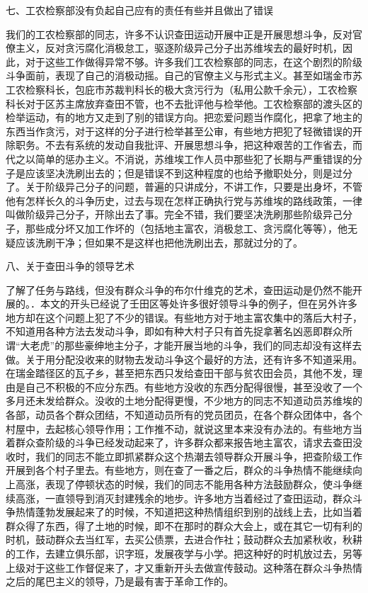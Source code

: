 七、工农检察部没有负起自己应有的责任有些并且做出了错误

我们的工农检察部的同志，许多不认识查田运动开展中正是开展思想斗争，反对官僚主义，反对贪污腐化消极怠工，驱逐阶级异己分子出苏维埃去的最好时机，因此，对于这些工作做得异常不够。许多我们工农检察部的同志，在这个剧烈的阶级斗争面前，表现了自己的消极动摇。自己的官僚主义与形式主义。甚至如瑞金市苏工农检察科长，包庇市苏裁判科长的极大贪污行为（私用公款千余元），工农检察科长对于区苏主席放弃查田不管，也不去批评他与检举他。工农检察部的渡头区的检举运动，有的地方又走到了别的错误方向。把恋爱问题当作腐化，把拿了地主的东西当作贪污，对于这样的分子进行检举甚至公审，有些地方把犯了轻微错误的开除职务。不去有系统的发动自我批评、开展思想斗争，把这种艰苦的工作省去，而代之以简单的惩办主义。不消说，苏维埃工作人员中那些犯了长期与严重错误的分子是应该坚决洗刷出去的；但是错误不到这种程度的也给予撤职处分，则是过分了。关于阶级异己分子的问题，普遍的只讲成分，不讲工作，只要是出身坏，不管他有怎样长久的斗争历史，过去与现在怎样正确执行党与苏维埃的路线政策，一律叫做阶级异己分子，开除出去了事。完全不错，我们要坚决洗刷那些阶级异己分子，那些成分坏又加工作坏的（包括地主富农，消极怠工、贪污腐化等等），他无疑应该洗刷干净；但如果不是这样也把他洗刷出去，那就过分的了。

八、关于查田斗争的领导艺术

了解了任务与路线，但没有群众斗争的布尔什维克的艺术，查田运动是仍然不能开展的。．本文的开头已经说了壬田区等处许多很好领导斗争的例子，但在另外许多地方却在这个问题上犯了不少的错误。有些地方对于地主富农集中的落后大村子，不知道用各种方法去发动斗争，即如有种大村子只有首先捉拿著名凶恶即群众所谓“大老虎”的那些豪绅地主分子，才能开展当地的斗争，我们的同志却没有这样去做。关于用分配没收来的财物去发动斗争这个最好的方法，还有许多不知道采用。在瑞金踏径区的瓦子乡，甚至把东西只发给查田干部与贫农田会员，其他不发，理由是自己不积极的不应分东西。有些地方没收的东西分配得很慢，甚至没收了一个多月还未发给群众。没收的土地分配得更慢，不少地方的同志不知道动员苏维埃的各部，动员各个群众团结，不知道动员所有的党员团员，在各个群众团体中，各个村屋中，去起核心领导作用；工作推不动，就说这里本来没有办法的。有些地方当着群众查阶级的斗争已经发动起来了，许多群众都来报告地主富农，请求去查田没收时，我们的同志不能立即抓紧群众这个热潮去领导群众开展斗争，把查阶级工作开展到各个村子里去。有些地方，则在查了一番之后，群众的斗争热情不能继续向上高涨，表现了停顿状态的时候，我们的同志不能用各种方法鼓励群众，使斗争继续高涨，一直领导到消灭封建残余的地步。许多地方当着经过了查田运动，群众斗争热情蓬勃发展起来了的时候，不知道把这种热情组织到别的战线上去，比如当着群众得了东西，得了土地的时候，即不在那时的群众大会上，或在其它一切有利的时机，鼓动群众去当红军，去买公债票，去进合作社；鼓动群众去加紧秋收，秋耕的工作，去建立俱乐部，识字班，发展夜学与小学。把这种好的时机放过去，另等上级对于这些工作督促来了，才又重新开头去做宣传鼓动。这种落在群众斗争热情之后的尾巴主义的领导，乃是最有害于革命工作的。


